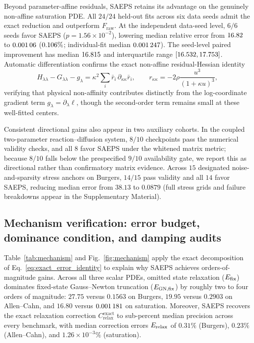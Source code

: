 \documentclass[preprint,11pt]{elsarticle}
\newcommand{\Fraw}{F_{\mathrm{raw}}}
\newcommand{\Cexact}{C_{\mathrm{relax}}^{\mathrm{exact}}}
\begin{document}
Beyond parameter-affine residuals, SAEPS retains its advantage on the genuinely non-affine saturation PDE.
All $24/24$ held-out fits across six data seeds admit the exact reduction and outperform $\Fraw$.
At the independent data-seed level, $6/6$ seeds favor SAEPS ($p=1.56\times10^{-2}$), lowering median relative error from $\num{16.82}$ to $\num{0.00106}$ ($\num{0.106}\%$; individual-fit median $\num{0.001247}$).
The seed-level paired improvement has median $\num{16.815}$ and interquartile range $[\num{16.532},\num{17.753}]$.
Automatic differentiation confirms the exact non-affine residual-Hessian identity
\begin{equation}
 H_{\lambda\lambda}-G_{\lambda\lambda}-g_\lambda
 =\kappa^2\sum_i\bar r_i\,\partial_{\kappa\kappa}\bar r_i,
 \qquad
 r_{\kappa\kappa}=-2\rho\frac{u^3}{(1+\kappa u)^3},
 \label{eq:nonaffine_identity}
\end{equation}
verifying that physical non-affinity contributes distinctly from the log-coordinate gradient term $g_\lambda=\partial_\lambda\ell$, though the second-order term remains small at these well-fitted centers.

Consistent directional gains also appear in two auxiliary cohorts.
In the coupled two-parameter reaction--diffusion system, $8/10$ checkpoints pass the numerical validity checks, and all $8$ favor SAEPS under the whitened matrix metric; because $8/10$ falls below the prespecified $9/10$ availability gate, we report this as directional rather than confirmatory matrix evidence.
Across $15$ designated noise-and-sparsity stress anchors on Burgers, $14/15$ pass validity and all $14$ favor SAEPS, reducing median error from $38.13$ to $0.0879$ (full stress grids and failure breakdowns appear in the Supplementary Material).

\subsection{Mechanism verification: error budget, dominance condition, and damping audits}
\label{sec:mechanism_results}

Table~\ref{tab:mechanism} and Fig.~\ref{fig:mechanism} apply the exact decomposition of Eq.~\eqref{eq:exact_error_identity} to explain why SAEPS achieves orders-of-magnitude gains.
Across all three scalar PDEs, omitted state relaxation ($E_{\rm fix}$) dominates fixed-state Gauss--Newton truncation ($E_{\rm GN,fix}$) by roughly two to four orders of magnitude: $27.75$ versus $0.1563$ on Burgers, $19.95$ versus $0.2903$ on Allen--Cahn, and $16.80$ versus $\num{0.001181}$ on saturation.
Moreover, SAEPS recovers the exact relaxation correction $\Cexact$ to sub-percent median precision across every benchmark, with median correction errors $E_{\rm relax}$ of $0.31\%$ (Burgers), $0.23\%$ (Allen--Cahn), and $1.26\times10^{-3}\%$ (saturation).
\end{document}
